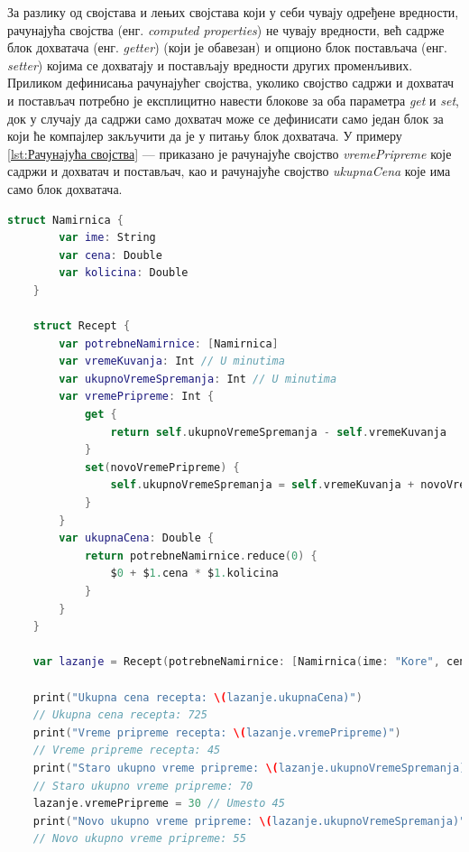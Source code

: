 \documentclass[12pt,oneside]{memoir}
\begin{document}
\indent За разлику од својстава и лењих својстава који у себи чувају одређене вредности, рачунајућа својства (енг. \textit{computed properties}) не чувају вредности, већ садрже блок дохватача (енг. \textit{getter}) (који је обавезан) и опционо блок постављача (енг. \textit{setter}) којима се дохватају и постављају вредности других променљивих. Приликом дефинисања рачунајућег својства, уколико својство садржи и дохватач и постављач потребно је експлицитно навести блокове за оба параметра \textit{get} и \textit{set}, док у случају да садржи само дохватач може се дефинисати само један блок за који ће компајлер закључити да је у питању блок дохватача. У примеру \ref{lst:Рачунајућа својства} ---  приказано је рачунајуће својство \textit{vremePripreme} које садржи и дохватач и постављач, као и рачунајуће својство \textit{ukupnaCena} које има само блок дохватача.

\begin{lstlisting}[caption=\textit{{Рачунајућа својства}}, label={lst:Рачунајућа својства}, language=Swift, frame=single]
    struct Namirnica {
        var ime: String
        var cena: Double
        var kolicina: Double
    }
    
    struct Recept {
        var potrebneNamirnice: [Namirnica]
        var vremeKuvanja: Int // U minutima
        var ukupnoVremeSpremanja: Int // U minutima
        var vremePripreme: Int {
            get {
                return self.ukupnoVremeSpremanja - self.vremeKuvanja
            }
            set(novoVremePripreme) {
                self.ukupnoVremeSpremanja = self.vremeKuvanja + novoVremePripreme
            }
        }
        var ukupnaCena: Double {
            return potrebneNamirnice.reduce(0) {
                $0 + $1.cena * $1.kolicina
            }
        }
    }
    
    var lazanje = Recept(potrebneNamirnice: [Namirnica(ime: "Kore", cena: 250, kolicina: 1), Namirnica(ime: "Mleveno meso", cena: 500, kolicina: 0.75), Namirnica(ime: "Sos", cena: 100, kolicina: 1)], vremeKuvanja: 25, ukupnoVremeSpremanja: 70)
    
    print("Ukupna cena recepta: \(lazanje.ukupnaCena)")
    // Ukupna cena recepta: 725
    print("Vreme pripreme recepta: \(lazanje.vremePripreme)")
    // Vreme pripreme recepta: 45
    print("Staro ukupno vreme pripreme: \(lazanje.ukupnoVremeSpremanja)")
    // Staro ukupno vreme pripreme: 70
    lazanje.vremePripreme = 30 // Umesto 45
    print("Novo ukupno vreme pripreme: \(lazanje.ukupnoVremeSpremanja)")
    // Novo ukupno vreme pripreme: 55
\end{lstlisting}
\end{document}
